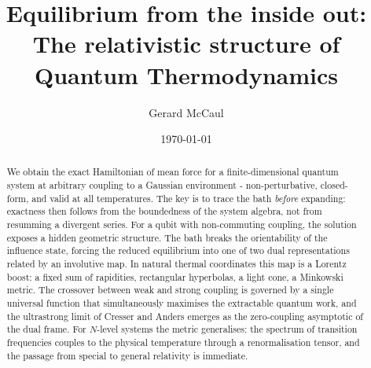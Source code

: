 ﻿\documentclass[aps,prl,twocolumn,superscriptaddress,showpacs,floatfix]{revtex4-2}
\begin{document}
\title{Equilibrium from the inside out:\\ The relativistic structure of Quantum Thermodynamics}
\author{Gerard McCaul}
\date{\today}

\begin{abstract}
We obtain the exact Hamiltonian of mean force for a finite-dimensional quantum
system at arbitrary coupling to a Gaussian environment - non-perturbative,
closed-form, and valid at all temperatures. The key is to trace the bath
\emph{before} expanding: exactness then follows from the boundedness of the
system algebra, not from resumming a divergent series. For a qubit with
non-commuting coupling, the solution exposes a hidden geometric structure. The
bath breaks the orientability of the influence state, forcing the reduced
equilibrium into one of two dual representations related by an involutive map.
In natural thermal coordinates this map is a Lorentz boost: a fixed sum of
rapidities, rectangular hyperbolas, a light cone, a Minkowski metric. The
crossover between weak and strong coupling is governed by a single universal
function that simultaneously maximises the extractable quantum work, and the
ultrastrong limit of Cresser and Anders emerges as the zero-coupling
asymptotic of the dual frame. For $N$-level systems the metric generalises:
the spectrum of transition frequencies couples to the physical temperature
through a renormalisation tensor, and the passage from special to general
relativity is immediate.
\end{abstract}


\maketitle






% 





\appendix
\setcounter{secnumdepth}{2}






\end{document}

